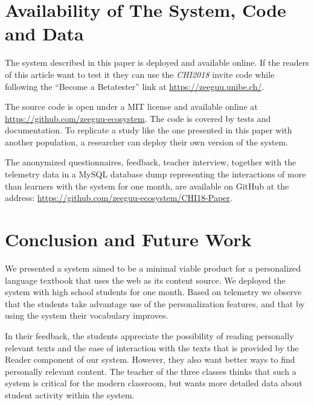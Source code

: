 \section{Availability of The System, Code and Data}

The system described in this paper is deployed and available online. If the readers of this article want to test it they can use the {\em CHI2018} invite code while following the  ``Become a Betatester'' link at \url{https://zeeguu.unibe.ch/}.

The source code is open under a MIT license and available online at \url{https://github.com/zeeguu-ecosystem}. The code is covered by tests and documentation. To replicate a study like the one presented in this paper with another population, a researcher can deploy their own version of the system. 

The anonymized questionnaires, feedback, teacher interview, 
together with the telemetry data in a MySQL database dump representing the interactions of more than \students learners with the system for one month, are available on GitHub at the address: \url{https://github.com/zeeguu-ecosystem/CHI18-Paper}. 





\section{Conclusion and Future Work}
We presented a system aimed to be a minimal viable product for a personalized language textbook that uses the web as its content source. We deployed the system with \studs high school students for one month. Based on telemetry we observe that the students take advantage use of the personalization features, and that by using the system their vocabulary improves. 

In their feedback, the students appreciate the possibility of reading personally relevant texts and the ease of interaction with the texts that is provided by the Reader component of our system. However, they also want better ways to find personally relevant content. The teacher of the three classes thinks that such a system is critical for the modern classroom, but wants more detailed data about student activity within the system.

